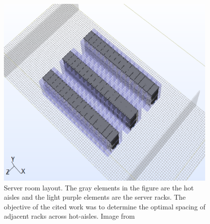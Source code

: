 \begin{figure} [!h]
\centering
\includegraphics[scale=.5]{methodology/images/server_room.png}

\caption[Server room layout]{Server room layout. The gray elements in the figure are the hot aisles and the light purple elements are the server racks. The objective of the cited work was to determine the optimal spacing of adjacent racks across hot-aisles.  Image from \cite{sahini16}}
\label{img_server_room_bem}
\end{figure}